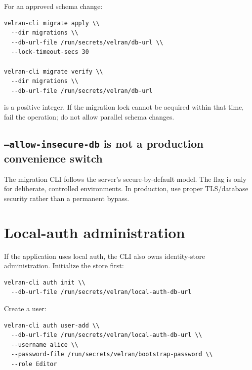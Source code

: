 For an approved schema change:

\begin{lstlisting}
velran-cli migrate apply \\
  --dir migrations \\
  --db-url-file /run/secrets/velran/db-url \\
  --lock-timeout-secs 30

velran-cli migrate verify \\
  --dir migrations \\
  --db-url-file /run/secrets/velran/db-url
\end{lstlisting}

 is a positive integer. If the migration lock cannot be acquired within that time, fail the operation; do not allow parallel schema changes.

\subsection*{\texttt{--allow-insecure-db} is not a production convenience switch}

The migration CLI follows the server's secure-by-default model. The  flag is only for deliberate, controlled environments. In production, use proper TLS/database security rather than a permanent bypass.

\section{Local-auth administration}

If the application uses local auth, the CLI also owns identity-store administration. Initialize the store first:

\begin{lstlisting}
velran-cli auth init \\
  --db-url-file /run/secrets/velran/local-auth-db-url
\end{lstlisting}

Create a user:

\begin{lstlisting}
velran-cli auth user-add \\
  --db-url-file /run/secrets/velran/local-auth-db-url \\
  --username alice \\
  --password-file /run/secrets/velran/bootstrap-password \\
  --role Editor
\end{lstlisting}

